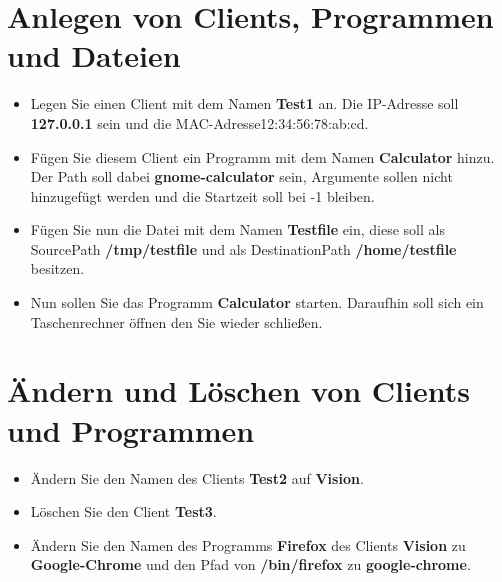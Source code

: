 \documentclass[accentcolor=tud1a,11pt]{tudexercise}
\begin{document}
\nutzerstudie
\section*{Anlegen von Clients, Programmen und Dateien}
\begin{itemize}
	\item Legen Sie einen Client mit dem Namen \textbf{Test1} an. Die IP-Adresse soll \textbf{127.0.0.1} sein und die MAC-Adresse{12:34:56:78:ab:cd}.
	\item Fügen Sie diesem Client ein Programm mit dem Namen \textbf{Calculator} hinzu. Der Path soll dabei \textbf{gnome-calculator} sein, Argumente sollen nicht hinzugefügt werden und die Startzeit soll bei -1 bleiben. 
	\item Fügen Sie nun die Datei mit dem Namen \textbf{Testfile} ein, diese soll als SourcePath \textbf{/tmp/testfile} und als DestinationPath \textbf{/home/testfile} besitzen.
	\item Nun sollen Sie das Programm \textbf{Calculator} starten. Daraufhin soll sich ein Taschenrechner öffnen den Sie wieder schließen.
\end{itemize}
\section*{Ändern und Löschen von Clients und Programmen}
\begin{itemize}
	\item Ändern Sie den Namen des Clients \textbf{Test2} auf \textbf{Vision}.
	\item Löschen Sie den Client \textbf{Test3}.
	\item Ändern Sie den Namen des Programms \textbf{Firefox} des Clients \textbf{Vision} zu \textbf{Google-Chrome} und den Pfad von \textbf{/bin/firefox} zu \textbf{google-chrome}.
\end{itemize}
\end{document}
